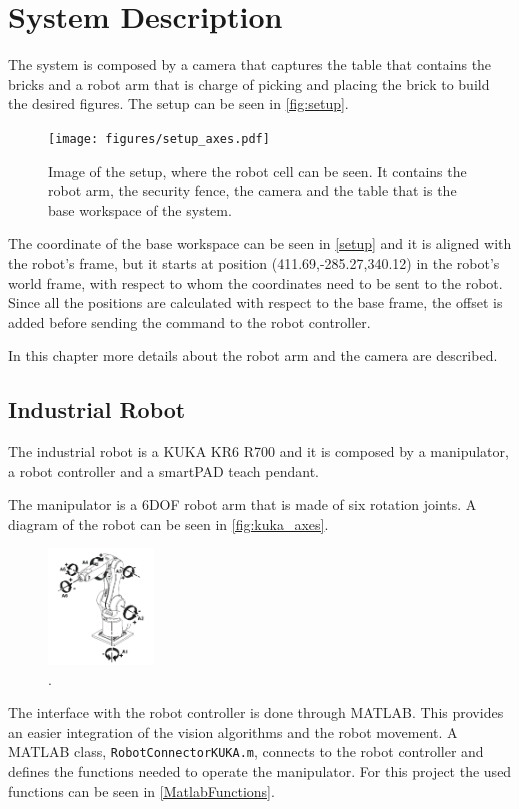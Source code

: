 \chapter{System Description}\label{chap:systemDescription}
The system is composed by a camera that captures the table that contains the bricks and a robot arm that is charge of picking and placing the brick to build the desired figures. The setup can be seen in \autoref{fig:setup}.
\begin{figure}[H]
    \texttt{[image: figures/setup\_axes.pdf]}
    \caption{Image of the setup, where the robot cell can be seen. It contains the robot arm, the security fence, the camera and the table that is the base workspace of the system. }
    \label{fig:setup}
\end{figure}

The coordinate of the base workspace can be seen in \autoref{setup} and it is aligned with the robot's frame, but it starts at position (411.69,-285.27,340.12) in the robot's world frame, with respect to whom the coordinates need to be sent to the robot. Since all the positions are calculated with respect to the base frame, the offset is added before sending the command to the robot controller.
  
In this chapter more details about the robot arm and the camera are described. 

\section{Industrial Robot}
The industrial robot is a KUKA KR6 R700 and it is composed by a manipulator, a robot controller and a smartPAD teach pendant. 

The manipulator is a 6DOF robot arm that is made of six rotation joints. A diagram of the robot can be seen in \autoref{fig:kuka_axes}.
\begin{figure}[H]
    \includegraphics[width=0.25\textwidth]{figures/kuka_axes.png}
    \caption{.\cite{kuka} }
    \label{fig:kuka_axes}
\end{figure}

The interface with the robot controller is done through MATLAB. This provides an easier integration of the vision algorithms and the robot movement. A MATLAB class, \lstinline[style=matlabinline]{RobotConnectorKUKA.m}, connects to the robot controller and defines the functions needed to operate the manipulator. For this project the used functions can be seen in \autoref{MatlabFunctions}.


